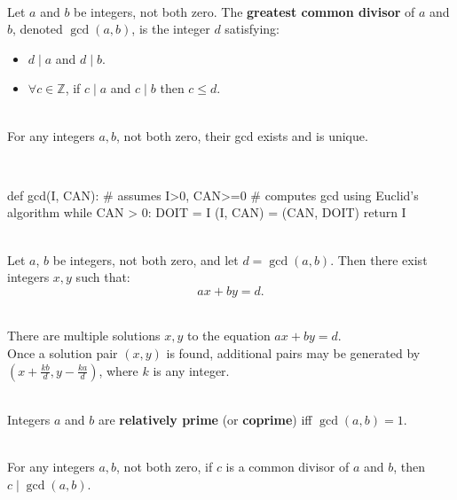 \documentclass[12pt]{article}
\begin{document}
\begin{definition}[4.5.1]
\hfill\\
\normalfont Let $a$ and $b$ be integers, not both zero. The \textbf{greatest common
divisor} of $a$ and $b$, denoted $\gcd(a, b)$, is the integer $d$ satisfying:
\begin{itemize}
\item $d \mid a$ and $d \mid b$.
\item $ \forall c \in\mathbb{Z}$, if $c \mid a$ and $c \mid b$ then $c \leq d$.
\end{itemize}
\end{definition}
\begin{proposition}[4.5.2]
\hfill\\
\normalfont For any integers $a, b$, not both zero, their gcd exists and is unique.
\end{proposition}
\begin{algorithm}
\hfill\\
\normalfont
\begin{python}
def gcd(I, CAN):
  # assumes I>0, CAN>=0
  # computes gcd using Euclid's algorithm
  while CAN > 0:
    DOIT = I %
    (I, CAN) = (CAN, DOIT)
  return I
\end{python}
\end{algorithm}
\begin{theorem}[4.5.3]
\hfill\\
\normalfont Let $a$, $b$ be integers, not both zero, and let $d =\gcd(a, b)$. Then
there exist integers $x, y$ such that:
\[ax + by = d.\]
\end{theorem}
\begin{proposition}
\hfill\\
\normalfont There are multiple solutions $x, y$ to the equation $ax + by = d$.\\
Once a solution pair $(x, y)$ is found, additional pairs may be generated by
$(x + \frac{kb}{d}, y - \frac{ka}{d} )$, where $k$ is any integer.
\end{proposition}
\begin{definition}[4.5.4]
\hfill\\
\normalfont Integers $a$ and $b$ are \textbf{relatively prime} (or \textbf{coprime}) iff $\gcd(a, b) = 1$.
\end{definition}
\begin{proposition}[4.5.5]
\hfill\\
\normalfont For any integers $a, b$, not both zero, if $c$ is a common divisor of $a$ and $b$,
then $c \mid \gcd(a, b)$.
\end{proposition}
\end{document}
